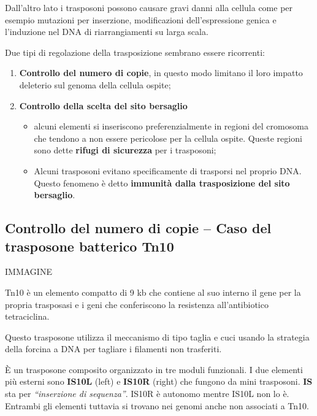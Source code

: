 \documentclass[11pt]{book}
\begin{document}
Dall'altro lato i trasposoni possono causare gravi danni alla cellula
come per esempio mutazioni per inserzione, modificazioni
dell'espressione genica e l'induzione nel DNA di riarrangiamenti su
larga scala.

Due tipi di regolazione della trasposizione sembrano essere ricorrenti:

\begin{enumerate}
\def\labelenumi{\arabic{enumi}.}
\itemsep1pt\parskip0pt
\item
  \textbf{Controllo del numero di copie}, in questo modo limitano il
  loro impatto deleterio sul genoma della cellula ospite;
\item
  \textbf{Controllo della scelta del sito bersaglio}

  \begin{itemize}
  \itemsep1pt\parskip0pt
  \item
    alcuni elementi si inseriscono preferenzialmente in regioni del
    cromosoma che tendono a non essere pericolose per la cellula ospite.
    Queste regioni sono dette \textbf{rifugi di sicurezza} per i
    trasposoni;
  \item
    Alcuni trasposoni evitano specificamente di trasporsi nel proprio
    DNA. Questo fenomeno è detto \textbf{immunità dalla trasposizione
    del sito bersaglio}.
  \end{itemize}
\end{enumerate}

\subsection{Controllo del numero di copie -- Caso del trasposone
batterico
Tn10}\label{controllo-del-numero-di-copie-caso-del-trasposone-batterico-tn10}

IMMAGINE

Tn10 è un elemento compatto di 9 kb che contiene al suo interno il gene
per la propria trasposasi e i geni che conferiscono la resistenza
all'antibiotico tetraciclina.

Questo trasposone utilizza il meccanismo di tipo taglia e cuci usando la
strategia della forcina a DNA per tagliare i filamenti non trasferiti.

È un trasposone composito organizzato in tre moduli funzionali. I due
elementi più esterni sono \textbf{IS10L} (left) e \textbf{IS10R} (right)
che fungono da mini trasposoni. \textbf{IS} sta per \emph{``inserzione
di sequenza''}. IS10R è autonomo mentre IS10L non lo è. Entrambi gli
elementi tuttavia si trovano nei genomi anche non associati a Tn10.
\end{document}
